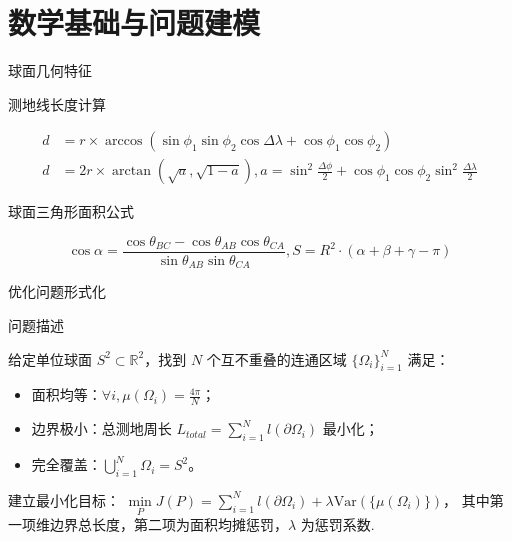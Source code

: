 \documentclass[12pt,aspectratio=169]{beamer}
\begin{document}
\section{数学基础与问题建模}

\begin{frame}{球面几何特征}

  测地线长度计算

  $$
    \begin{aligned}
      d&=r\times \arccos(\sin\phi_1\sin\phi_2\cos\Delta\lambda+\cos\phi_1\cos\phi_2)\\
      d&=2r\times \arctan(\sqrt{a},\sqrt{1-a}), a=\sin^2\frac{\Delta\phi}{2}+\cos\phi_1\cos\phi_2
      \sin^2\frac{\Delta\lambda}{2}
    \end{aligned}
  $$

  球面三角形面积公式

  $$
    \cos\alpha=\frac{\cos\theta_{BC}-\cos\theta_{AB}\cos\theta_{CA}}{\sin\theta_{AB}\sin\theta_{CA}},
    S=R^2\cdot(\alpha+\beta+\gamma-\pi)
  $$

\end{frame}

\begin{frame}{优化问题形式化}

  \begin{block}{问题描述}

    给定单位球面 $S^2\subset \mathbb{R}^2$，找到 $N$ 个互不重叠的连通区域 $\{\Omega_i\}_{i=1}^N$ 满足：
    \begin{itemize}
      \item 面积均等：$\forall i,\mu(\Omega_i)=\frac{4\pi}{N}$；
      \item 边界极小：总测地周长 $L_{total}=\sum\limits_{i=1}^Nl(\partial\Omega_i)$ 最小化；
      \item 完全覆盖：$\bigcup\limits_{i=1}^N\Omega_i=S^2$。
    \end{itemize}

  \end{block}

  建立最小化目标：
  $\min\limits_PJ(P)=\sum\limits_{i=1}^Nl(\partial\Omega_i)+\lambda\textrm{Var}(\{\mu(\Omega_i)\})$，
  其中第一项维边界总长度，第二项为面积均摊惩罚，$\lambda$ 为惩罚系数. 

\end{frame}
\end{document}
